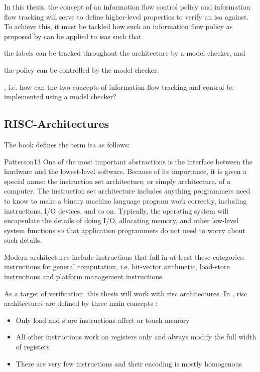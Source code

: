 In this thesis, the concept of an information flow control policy and information flow tracking will serve to define higher-level properties to verify an \gls{isa} against.
To achieve this, it must be tackled how such an information flow policy as proposed by \citeauthor{Ferraiuolo17} can be applied to \glspl{isa} such that \begin{enumerate*}[label=\alph*)]
    \item the labels can be tracked throughout the architecture by a model checker, and
    \item the policy can be controlled by the model checker.
\end{enumerate*}, i.e. how can the two concepts of information flow tracking and control be implemented using a model checker?

\subsection{RISC-Architectures}
\label{sec:riscs}

The book  defines the term \gls{isa} as follows:
\begin{displaycquote}[p.22]{Patterson13}
    One of the most important abstractions  is the interface between the hardware and the lowest-level software.
    Because of its importance, it is given a special name: the instruction set architecture, or simply architecture, of a computer.
    The instruction set architecture includes anything programmers need to know to make a binary machine language program work correctly, including instructions, I/O devices, and so on.
    Typically, the operating system will encapsulate the details of doing I/O, allocating memory, and other low-level system functions so that application programmers do not need to worry about such details.
\end{displaycquote}

Modern architectures include instructions that fall in at least these categories: instructions for general computation, i.e. bit-vector arithmetic, load-store instructions and platform management instructions.

As a target of verification, this thesis will work with \gls{risc} architectures.
In , \gls{risc} architectures are defined by three main concepts \cite[p.C-4]{Hennessy12}:
\begin{itemize}
    \item Only load and store instructions affect or touch memory
    \item All other instructions work on registers only and always modify the full width of registers
    \item There are very few instructions and their encoding is mostly homogenous
\end{itemize}

